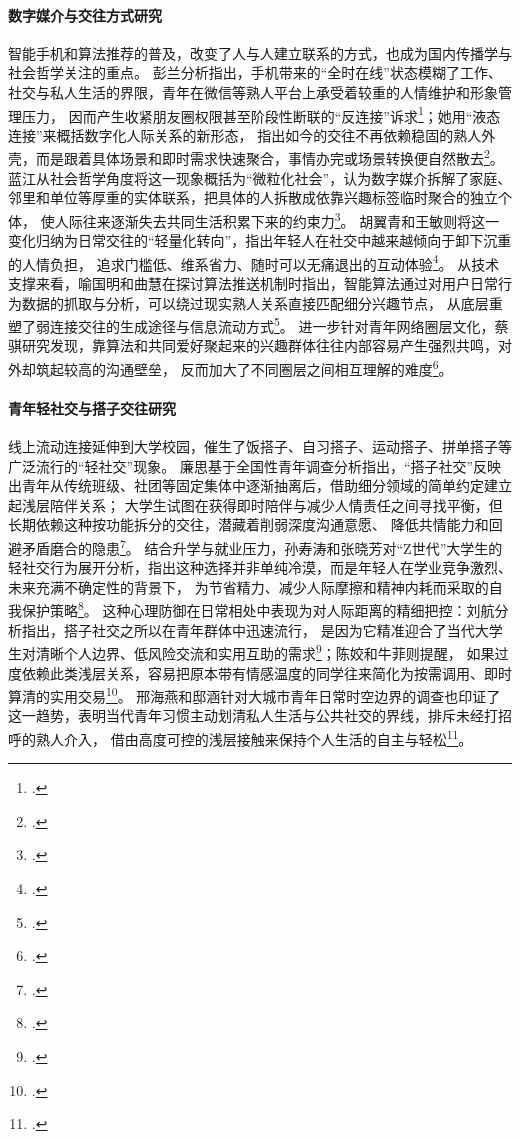\paragraph{数字媒介与交往方式研究}
智能手机和算法推荐的普及，改变了人与人建立联系的方式，也成为国内传播学与社会哲学关注的重点。
彭兰分析指出，手机带来的“全时在线”状态模糊了工作、社交与私人生活的界限，青年在微信等熟人平台上承受着较重的人情维护和形象管理压力，
因而产生收紧朋友圈权限甚至阶段性断联的“反连接”诉求\footcite{GJXW201902002}；她用“液态连接”来概括数字化人际关系的新形态，
指出如今的交往不再依赖稳固的熟人外壳，而是跟着具体场景和即时需求快速聚合，事情办完或场景转换便自然散去\footcite{Peng2021}。
蓝江从社会哲学角度将这一现象概括为“微粒化社会”，认为数字媒介拆解了家庭、邻里和单位等厚重的实体联系，把具体的人拆散成依靠兴趣标签临时聚合的独立个体，
使人际往来逐渐失去共同生活积累下来的约束力\footcite{Lan2022}。
胡翼青和王敏则将这一变化归纳为日常交往的“轻量化转向”，指出年轻人在社交中越来越倾向于卸下沉重的人情负担，
追求门槛低、维系省力、随时可以无痛退出的互动体验\footcite{Hu2019}。
从技术支撑来看，喻国明和曲慧在探讨算法推送机制时指出，智能算法通过对用户日常行为数据的抓取与分析，可以绕过现实熟人关系直接匹配细分兴趣节点，
从底层重塑了弱连接交往的生成途径与信息流动方式\footcite{XJSF202001015}。
进一步针对青年网络圈层文化，蔡骐研究发现，靠算法和共同爱好聚起来的兴趣群体往往内部容易产生强烈共鸣，对外却筑起较高的沟通壁垒，
反而加大了不同圈层之间相互理解的难度\footcite{Cai2018}。

\paragraph{青年轻社交与搭子交往研究}
线上流动连接延伸到大学校园，催生了饭搭子、自习搭子、运动搭子、拼单搭子等广泛流行的“轻社交”现象。
廉思基于全国性青年调查分析指出，“搭子社交”反映出青年从传统班级、社团等固定集体中逐渐抽离后，借助细分领域的简单约定建立起浅层陪伴关系；
大学生试图在获得即时陪伴与减少人情责任之间寻找平衡，但长期依赖这种按功能拆分的交往，潜藏着削弱深度沟通意愿、
降低共情能力和回避矛盾磨合的隐患\footcite{Lian2024a}。
结合升学与就业压力，孙寿涛和张晓芳对“Z世代”大学生的轻社交行为展开分析，指出这种选择并非单纯冷漠，而是年轻人在学业竞争激烈、未来充满不确定性的背景下，
为节省精力、减少人际摩擦和精神内耗而采取的自我保护策略\footcite{Sun2023}。
这种心理防御在日常相处中表现为对人际距离的精细把控：刘航分析指出，搭子社交之所以在青年群体中迅速流行，
是因为它精准迎合了当代大学生对清晰个人边界、低风险交流和实用互助的需求\footcite{LiuHang2023}；陈姣和牛菲则提醒，
如果过度依赖此类浅层关系，容易把原本带有情感温度的同学往来简化为按需调用、即时算清的实用交易\footcite{ChenJiao2024}。
邢海燕和邸涵针对大城市青年日常时空边界的调查也印证了这一趋势，表明当代青年习惯主动划清私人生活与公共社交的界线，排斥未经打招呼的熟人介入，
借由高度可控的浅层接触来保持个人生活的自主与轻松\footcite{Xing2022}。

